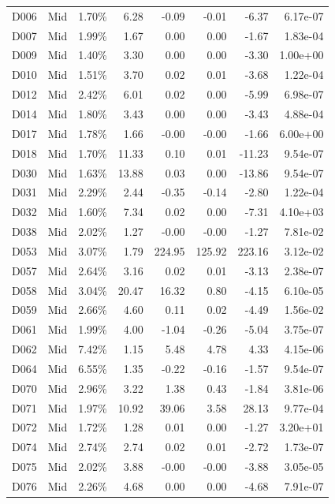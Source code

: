 \begin{tabular}{l l r r r r r r}
D006 & Mid & 1.70\% & 6.28 & -0.09 & -0.01 & -6.37 & 6.17e-07 \\
D007 & Mid & 1.99\% & 1.67 & 0.00 & 0.00 & -1.67 & 1.83e-04 \\
D009 & Mid & 1.40\% & 3.30 & 0.00 & 0.00 & -3.30 & 1.00e+00 \\
D010 & Mid & 1.51\% & 3.70 & 0.02 & 0.01 & -3.68 & 1.22e-04 \\
D012 & Mid & 2.42\% & 6.01 & 0.02 & 0.00 & -5.99 & 6.98e-07 \\
D014 & Mid & 1.80\% & 3.43 & 0.00 & 0.00 & -3.43 & 4.88e-04 \\
D017 & Mid & 1.78\% & 1.66 & -0.00 & -0.00 & -1.66 & 6.00e+00 \\
D018 & Mid & 1.70\% & 11.33 & 0.10 & 0.01 & -11.23 & 9.54e-07 \\
D030 & Mid & 1.63\% & 13.88 & 0.03 & 0.00 & -13.86 & 9.54e-07 \\
D031 & Mid & 2.29\% & 2.44 & -0.35 & -0.14 & -2.80 & 1.22e-04 \\
D032 & Mid & 1.60\% & 7.34 & 0.02 & 0.00 & -7.31 & 4.10e+03 \\
D038 & Mid & 2.02\% & 1.27 & -0.00 & -0.00 & -1.27 & 7.81e-02 \\
D053 & Mid & 3.07\% & 1.79 & 224.95 & 125.92 & 223.16 & 3.12e-02 \\
D057 & Mid & 2.64\% & 3.16 & 0.02 & 0.01 & -3.13 & 2.38e-07 \\
D058 & Mid & 3.04\% & 20.47 & 16.32 & 0.80 & -4.15 & 6.10e-05 \\
D059 & Mid & 2.66\% & 4.60 & 0.11 & 0.02 & -4.49 & 1.56e-02 \\
D061 & Mid & 1.99\% & 4.00 & -1.04 & -0.26 & -5.04 & 3.75e-07 \\
D062 & Mid & 7.42\% & 1.15 & 5.48 & 4.78 & 4.33 & 4.15e-06 \\
D064 & Mid & 6.55\% & 1.35 & -0.22 & -0.16 & -1.57 & 9.54e-07 \\
D070 & Mid & 2.96\% & 3.22 & 1.38 & 0.43 & -1.84 & 3.81e-06 \\
D071 & Mid & 1.97\% & 10.92 & 39.06 & 3.58 & 28.13 & 9.77e-04 \\
D072 & Mid & 1.72\% & 1.28 & 0.01 & 0.00 & -1.27 & 3.20e+01 \\
D074 & Mid & 2.74\% & 2.74 & 0.02 & 0.01 & -2.72 & 1.73e-07 \\
D075 & Mid & 2.02\% & 3.88 & -0.00 & -0.00 & -3.88 & 3.05e-05 \\
D076 & Mid & 2.26\% & 4.68 & 0.00 & 0.00 & -4.68 & 7.91e-07 \\

\end{tabular}
